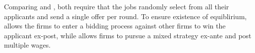 \documentclass[a4paper,12pt]{article}
\begin{document}
Comparing \cite{galenianos2009} and \cite{albrecht2006}, both require that the jobs randomly select from all their applicants and send a single offer per round. To ensure existence of equiblirium, \cite{albrecht2006} allows the firms to enter a bidding process against other firms to win the applicant ex-post, while \cite{galenianos2009} allows firms to pursue a mixed strategy ex-ante and post multiple wages.

\printbibliography
\end{document}
